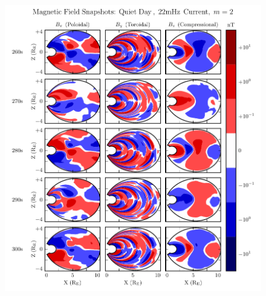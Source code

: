 \begin{figure}[!htb]
    \centering
    \includegraphics[width=\textwidth]{figures/snapshot_smallm.pdf}
    \caption[Magnetic Field Snapshots from a Small-\azm Run]{
      \todo{$\cdots$}
    }
    \label{fig_snapshot_smallm}
\end{figure}

